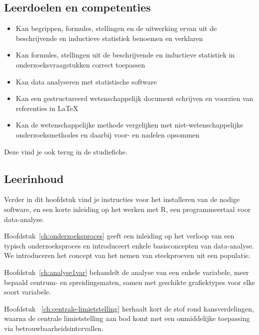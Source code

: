 \subsection{Leerdoelen en competenties}

\begin{itemize}
  \item Kan begrippen, formules, stellingen en de uitwerking ervan uit de beschrijvende en inductieve statistiek benoemen en verklaren
  \item Kan formules, stellingen uit de beschrijvende en inductieve statistiek in onderzoeksvraagstukken correct toepassen
  \item Kan data analyseren met statistische software
  \item Kan een gestructureerd wetenschappelijk document schrijven en voorzien van referenties in \LaTeX{}
  \item Kan de wetenschappelijke methode vergelijken met niet-wetenschappelijke onderzoeksmethodes en daarbij voor- en nadelen opsommen 
\end{itemize}

Deze vind je ook terug in de studiefiche.

\subsection{Leerinhoud}

Verder in dit hoofdstuk vind je instructies voor het installeren van de nodige software, en een korte inleiding op het werken met R, een programmeertaal voor data-analyse.

Hoofdstuk~\ref{ch:onderzoeksproces} geeft een inleiding op het verloop van een typisch onderzoeksproces en introduceert enkele basisconcepten van data-analyse. We introduceren het concept van het nemen van steekproeven uit een populatie.

Hoofdstuk~\ref{ch:analyse1var} behandelt de analyse van een enkele variabele, meer bepaald centrum- en spreidingsmaten, samen met geschikte grafiektypes voor elke soort variabele.


Hoofdstuk ~\ref{ch:centrale-limietstelling} herhaalt kort de stof rond kansverdelingen, waarna de centrale limietstelling aan bod komt met een onmiddelijke toepassing via betrouwbaarheidsintervallen. 

